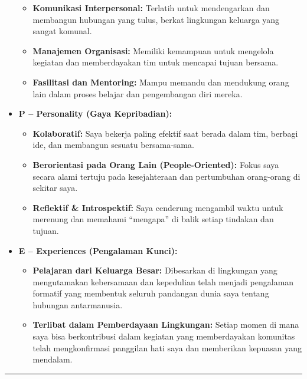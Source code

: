 \documentclass[
  letterpaper,
  DIV=11,
  numbers=noendperiod]{scrreprt}
\providecommand{\tightlist}{%
  \setlength{\itemsep}{0pt}\setlength{\parskip}{0pt}}
\begin{document}
\begin{itemize}
  \begin{itemize}
  \tightlist
  \item
    \textbf{Komunikasi Interpersonal:} Terlatih untuk mendengarkan dan
    membangun hubungan yang tulus, berkat lingkungan keluarga yang
    sangat komunal.
  \item
    \textbf{Manajemen Organisasi:} Memiliki kemampuan untuk mengelola
    kegiatan dan memberdayakan tim untuk mencapai tujuan bersama.
  \item
    \textbf{Fasilitasi dan Mentoring:} Mampu memandu dan mendukung orang
    lain dalam proses belajar dan pengembangan diri mereka.
  \end{itemize}
\item
  \textbf{P -- Personality (Gaya Kepribadian):}

  \begin{itemize}
  \tightlist
  \item
    \textbf{Kolaboratif:} Saya bekerja paling efektif saat berada dalam
    tim, berbagi ide, dan membangun sesuatu bersama-sama.
  \item
    \textbf{Berorientasi pada Orang Lain (People-Oriented):} Fokus saya
    secara alami tertuju pada kesejahteraan dan pertumbuhan orang-orang
    di sekitar saya.
  \item
    \textbf{Reflektif \& Introspektif:} Saya cenderung mengambil waktu
    untuk merenung dan memahami ``mengapa'' di balik setiap tindakan dan
    tujuan.
  \end{itemize}
\item
  \textbf{E -- Experiences (Pengalaman Kunci):}

  \begin{itemize}
  \tightlist
  \item
    \textbf{Pelajaran dari Keluarga Besar:} Dibesarkan di lingkungan
    yang mengutamakan kebersamaan dan kepedulian telah menjadi
    pengalaman formatif yang membentuk seluruh pandangan dunia saya
    tentang hubungan antarmanusia.
  \item
    \textbf{Terlibat dalam Pemberdayaan Lingkungan:} Setiap momen di
    mana saya bisa berkontribusi dalam kegiatan yang memberdayakan
    komunitas telah mengkonfirmasi panggilan hati saya dan memberikan
    kepuasan yang mendalam.
  \end{itemize}
\end{itemize}

\begin{center}\rule{0.5\linewidth}{0.5pt}\end{center}
\end{document}
